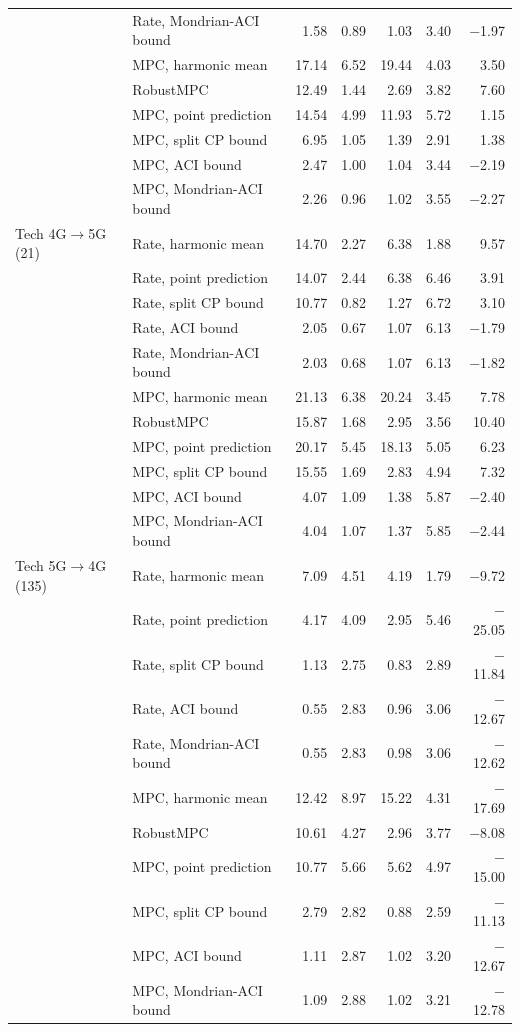\begin{table}[!t]
\begin{tabular}{llrrrrr}
 & Rate, Mondrian-ACI bound & 1.58 & 0.89 & 1.03 & 3.40 & $-$1.97 \\
 & MPC, harmonic mean & 17.14 & 6.52 & 19.44 & 4.03 & 3.50 \\
 & RobustMPC & 12.49 & 1.44 & 2.69 & 3.82 & 7.60 \\
 & MPC, point prediction & 14.54 & 4.99 & 11.93 & 5.72 & 1.15 \\
 & MPC, split CP bound & 6.95 & 1.05 & 1.39 & 2.91 & 1.38 \\
 & MPC, ACI bound & 2.47 & 1.00 & 1.04 & 3.44 & $-$2.19 \\
 & MPC, Mondrian-ACI bound & 2.26 & 0.96 & 1.02 & 3.55 & $-$2.27 \\
\midrule
Tech 4G$\rightarrow$5G (21) & Rate, harmonic mean & 14.70 & 2.27 & 6.38 & 1.88 & 9.57 \\
 & Rate, point prediction & 14.07 & 2.44 & 6.38 & 6.46 & 3.91 \\
 & Rate, split CP bound & 10.77 & 0.82 & 1.27 & 6.72 & 3.10 \\
 & Rate, ACI bound & 2.05 & 0.67 & 1.07 & 6.13 & $-$1.79 \\
 & Rate, Mondrian-ACI bound & 2.03 & 0.68 & 1.07 & 6.13 & $-$1.82 \\
 & MPC, harmonic mean & 21.13 & 6.38 & 20.24 & 3.45 & 7.78 \\
 & RobustMPC & 15.87 & 1.68 & 2.95 & 3.56 & 10.40 \\
 & MPC, point prediction & 20.17 & 5.45 & 18.13 & 5.05 & 6.23 \\
 & MPC, split CP bound & 15.55 & 1.69 & 2.83 & 4.94 & 7.32 \\
 & MPC, ACI bound & 4.07 & 1.09 & 1.38 & 5.87 & $-$2.40 \\
 & MPC, Mondrian-ACI bound & 4.04 & 1.07 & 1.37 & 5.85 & $-$2.44 \\
\midrule
Tech 5G$\rightarrow$4G (135) & Rate, harmonic mean & 7.09 & 4.51 & 4.19 & 1.79 & $-$9.72 \\
 & Rate, point prediction & 4.17 & 4.09 & 2.95 & 5.46 & $-$25.05 \\
 & Rate, split CP bound & 1.13 & 2.75 & 0.83 & 2.89 & $-$11.84 \\
 & Rate, ACI bound & 0.55 & 2.83 & 0.96 & 3.06 & $-$12.67 \\
 & Rate, Mondrian-ACI bound & 0.55 & 2.83 & 0.98 & 3.06 & $-$12.62 \\
 & MPC, harmonic mean & 12.42 & 8.97 & 15.22 & 4.31 & $-$17.69 \\
 & RobustMPC & 10.61 & 4.27 & 2.96 & 3.77 & $-$8.08 \\
 & MPC, point prediction & 10.77 & 5.66 & 5.62 & 4.97 & $-$15.00 \\
 & MPC, split CP bound & 2.79 & 2.82 & 0.88 & 2.59 & $-$11.13 \\
 & MPC, ACI bound & 1.11 & 2.87 & 1.02 & 3.20 & $-$12.67 \\
 & MPC, Mondrian-ACI bound & 1.09 & 2.88 & 1.02 & 3.21 & $-$12.78 \\
\bottomrule
\end{tabular}
\end{table}
